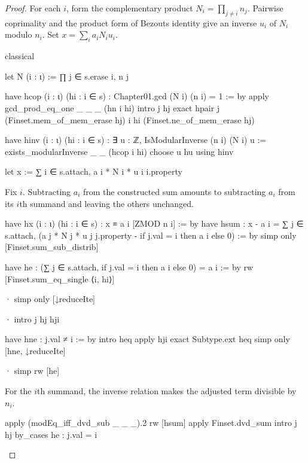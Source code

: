 \begin{proof}
  For each $i$, form the complementary product $N_i=\prod_{j\ne i}n_j$.
  Pairwise coprimality and the product form of Bezout\textquotesingle s identity give an inverse
  $u_i$ of $N_i$ modulo $n_i$.
  Set $x=\sum_i a_iN_i u_i$.

  \begin{lean}
    classical

    let N (i : ι) := ∏ j ∈ s.erase i, n j

    have hcop (i : ι) (hi : i ∈ s) : Chapter01.gcd (N i) (n i) = 1 := by
      apply gcd_prod_eq_one _ _ _ (hn i hi)
      intro j hj
      exact hpair j (Finset.mem_of_mem_erase hj) i hi (Finset.ne_of_mem_erase hj)

    have hinv (i : ι) (hi : i ∈ s) : ∃ u : ℤ, IsModularInverse (n i) (N i) u :=
      exists_modularInverse _ _ (hcop i hi)
    choose u hu using hinv

    let x := ∑ i ∈ s.attach, a i * N i * u i i.property
  \end{lean}

  Fix $i$.
  Subtracting $a_i$ from the constructed sum amounts to subtracting $a_i$ from its $i$th summand
  and leaving the others unchanged.

  \begin{lean}
    have hx (i : ι) (hi : i ∈ s) : x ≡ a i [ZMOD n i] := by
      have hsum : x - a i =
          ∑ j ∈ s.attach, (a j * N j * u j j.property - if j.val = i then a i else 0) := by
        simp only [Finset.sum_sub_distrib]

        have he : (∑ j ∈ s.attach, if j.val = i then a i else 0) = a i := by
          rw [Finset.sum_eq_single ⟨i, hi⟩]

          · simp only [↓reduceIte]

          · intro j hj hji

            have hne : j.val ≠ i := by
              intro heq
              apply hji
              exact Subtype.ext heq
            simp only [hne, ↓reduceIte]

          · simp
        rw [he]
  \end{lean}

  For the $i$th summand, the inverse relation makes the adjusted term divisible by $n_i$.

  \begin{lean}
    apply (modEq_iff_dvd_sub _ _ _).2
    rw [hsum]
    apply Finset.dvd_sum
    intro j hj
    by_cases he : j.val = i


\end{lean}
\end{proof}
